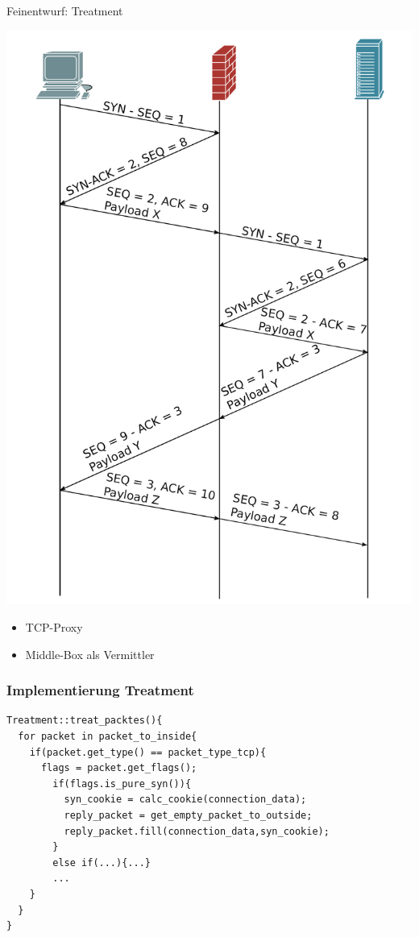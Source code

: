 \documentclass{beamer}
\begin{document}
\begin{frame}{Feinentwurf: Treatment}
    \begin{minipage}[h]{0.5\textwidth}
        \includegraphics[width=\textwidth, center]{splicing.pdf}
    \end{minipage}
    \hfill
    \begin{minipage}[h]{0.45\textwidth}
        \begin{itemize}
            \item TCP-Proxy
            \item Middle-Box als Vermittler
        \end{itemize}
    \end{minipage}
\end{frame}

\begin{frame}[fragile]
    \frametitle{Implementierung Treatment}
    {\footnotesize
        \begin{lstlisting}
Treatment::treat_packtes(){
  for packet in packet_to_inside{
    if(packet.get_type() == packet_type_tcp){
      flags = packet.get_flags();
        if(flags.is_pure_syn()){
          syn_cookie = calc_cookie(connection_data);
          reply_packet = get_empty_packet_to_outside;
          reply_packet.fill(connection_data,syn_cookie);		
        }
        else if(...){...}
        ...		
    } 	
  }			
}
		\end{lstlisting}
    }
\end{frame}
\end{document}
